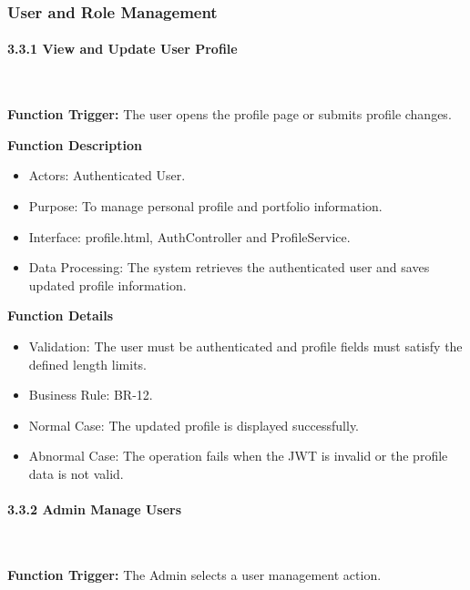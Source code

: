 \subsubsection{User and Role Management}
\label{subsubsec:user-role-management}

\paragraph*{3.3.1 View and Update User Profile}\leavevmode\\[-0.5em]
\label{par:view-update-user-profile}

\textbf{Function Trigger:} The user opens the profile page or submits profile changes.

\textbf{Function Description}
\begin{itemize}[leftmargin=1.5em, nosep]
    \item Actors: Authenticated User.
    \item Purpose: To manage personal profile and portfolio information.
    \item Interface: profile.html, AuthController and ProfileService.
    \item Data Processing: The system retrieves the authenticated user and saves updated profile information.
\end{itemize}

\textbf{Function Details}
\begin{itemize}[leftmargin=1.5em, nosep]
    \item Validation: The user must be authenticated and profile fields must satisfy the defined length limits.
    \item Business Rule: BR-12.
    \item Normal Case: The updated profile is displayed successfully.
    \item Abnormal Case: The operation fails when the JWT is invalid or the profile data is not valid.
\end{itemize}

\paragraph*{3.3.2 Admin Manage Users}\leavevmode\\[-0.5em]
\label{par:admin-manage-users}

\textbf{Function Trigger:} The Admin selects a user management action.

